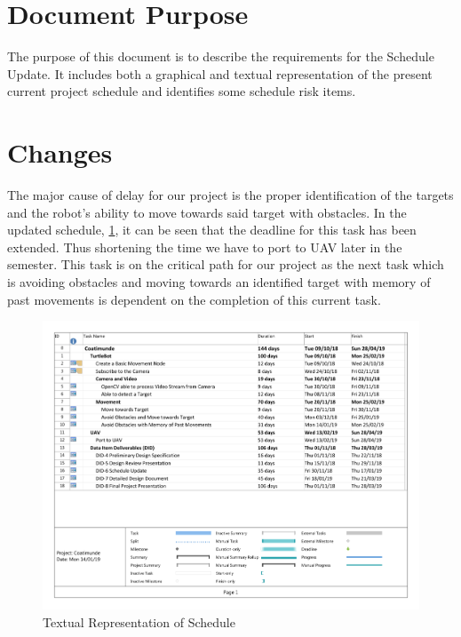 \documentclass{article}
\begin{document}
	\section{Document Purpose}
	
	The purpose of this document is to describe the requirements for the Schedule Update. It includes both a graphical and textual representation of the present current project schedule and identifies some schedule risk items.
	
	\section{Changes}
	
	The major cause of delay for our project is the proper identification of the targets and the robot's ability to move towards said target with obstacles. In the updated schedule, \ref{fig:SUp01}, it can be seen that the deadline for this task has been extended. Thus shortening the time we have to port to UAV later in the semester. This task is on the critical path for our project as the next task which is avoiding obstacles and moving towards an identified target with memory of past movements is dependent on the completion of this current task.
	
	\begin{figure}[H]
		\centering
		\includegraphics[width=\linewidth]{SUp01}
		\caption{Textual Representation of Schedule}
		\label{fig:SUp01}
	\end{figure}
\end{document}

